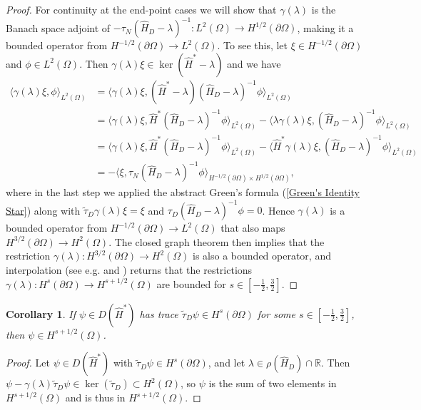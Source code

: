 \documentclass{article}
\numberwithin{equation}{section}
\newtheorem{corollary}{Corollary}[section]
\begin{document}
\begin{proof}
For continuity at the end-point cases we will show that $\gamma(\lambda)$ is the Banach space adjoint of $-\tau_N (\hat{H}_D-\lambda)^{-1}:L^2(\Omega)\to H^{1/2}(\partial \Omega)$, making it a bounded operator from $H^{-1/2}(\partial \Omega)\to L^2(\Omega)$. To see this, let $\xi \in H^{-1/2}(\partial \Omega)$ and $\phi \in L^2(\Omega)$. Then $\gamma(\lambda)\xi \in \ker(\hat{H}^*-\lambda)$ and we have
\begin{equation}
    \begin{split}
    \langle \gamma(\lambda)\xi, \phi \rangle_{L^2(\Omega)}&=\langle \gamma(\lambda)\xi, (\hat{H}^* - \lambda)(\hat{H}_D - \lambda)^{-1}\phi \rangle_{L^2(\Omega)}
        \\
    &=\langle \gamma(\lambda)\xi, \hat{H}^*(\hat{H}_D - \lambda)^{-1}\phi \rangle_{L^2(\Omega)}- \langle \lambda \gamma(\lambda)\xi, (\hat{H}_D-\lambda)^{-1}\phi \rangle_{L^2(\Omega)}
        \\
    &=\langle \gamma(\lambda)\xi, \hat{H}^*(\hat{H}_D - \lambda)^{-1}\phi \rangle_{L^2(\Omega)}- \langle \hat{H}^* \gamma(\lambda)\xi, (\hat{H}_D-\lambda)^{-1}\phi \rangle_{L^2(\Omega)}
        \\
    &=-\langle \xi, \tau_N (\hat{H}_D - \lambda)^{-1}\phi \rangle_{H^{-1/2}(\partial \Omega)\times H^{1/2}(\partial \Omega)},
 \end{split}
\end{equation}
  where in the last step we applied the abstract Green's formula (\ref{Green's Identity Star}) along with $\tilde{\tau}_D\gamma(\lambda)\xi=\xi$ and $\tau_D (\hat{H}_D-\lambda)^{-1}\phi=0$. Hence $\gamma(\lambda)$ is a bounded operator from $H^{-1/2}(\partial \Omega)\to L^2(\Omega)$ that also maps $H^{3/2}(\partial \Omega)\to H^2(\Omega)$. The closed graph theorem then implies that the restriction $\gamma(\lambda):H^{3/2}(\partial \Omega)\to H^2(\Omega)$ is also a bounded operator, and interpolation (see e.g. \cite[Theorem 1.4.3.3]{Grisvard} and \cite[Theorems 5.1 and 7.7]{LH1972}) returns that the restrictions $\gamma(\lambda):H^s(\partial \Omega)\to H^{s+1/2}(\Omega)$ are bounded for $s \in [-\frac{1}{2},\frac{3}{2}]$.
  \end{proof}
  \begin{corollary}\label{Converse Trace Regularity}
	If $\psi \in D(\hat{H}^*)$ has trace $\tilde{\tau}_D \psi \in H^s(\partial \Omega)$ for some $s \in [-\frac{1}{2},\frac{3}{2}]$, then $\psi \in H^{s+1/2}(\Omega)$.
	\end{corollary}
    \begin{proof}
        Let $\psi \in D(\hat{H}^*)$ with $\tilde{\tau}_D\psi \in H^s(\partial \Omega)$, and let $\lambda \in \rho(\hat{H}_D)\cap \mathbb{R}$. Then $\psi-\gamma(\lambda)\tilde{\tau}_D\psi \in \ker(\tilde{\tau}_D)\subset H^2(\Omega)$, so $\psi$ is the sum of two elements in $H^{s+1/2}(\Omega)$ and is thus in $H^{s+1/2}(\Omega)$.
    \end{proof}
\end{document}
